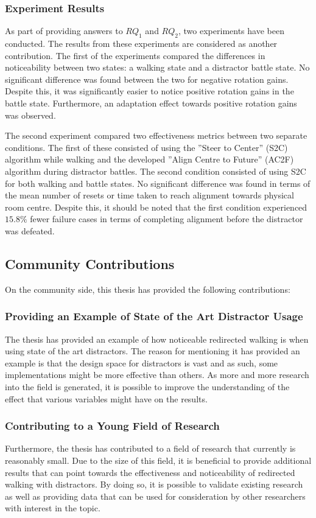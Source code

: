\subsubsection{Experiment Results}
As part of providing answers to $RQ_1$ and $RQ_2$, two experiments have been conducted. The results from these experiments are considered as another contribution. The first of the experiments compared the differences in noticeability between two states: a walking state and a distractor battle state. No significant difference was found between the two for negative rotation gains. Despite this, it was significantly easier to notice positive rotation gains in the battle state. Furthermore, an adaptation effect towards positive rotation gains was observed.

The second experiment compared two effectiveness metrics between two separate conditions. The first of these consisted of using the ''Steer to Center'' (S2C) algorithm while walking and the developed ''Align Centre to Future'' (AC2F) algorithm during distractor battles. The second condition consisted of using S2C for both walking and battle states. No significant difference was found in terms of the mean number of resets or time taken to reach alignment towards physical room centre. Despite this, it should be noted that the first condition experienced $15.8\%$ fewer failure cases in terms of completing alignment before the distractor was defeated. 

\subsection{Community Contributions}
On the community side, this thesis has provided the following contributions:

\subsubsection{Providing an Example of State of the Art Distractor Usage}
The thesis has provided an example of how noticeable redirected walking is when using state of the art distractors. The reason for mentioning it has provided an example is that the design space for distractors is vast and as such, some implementations might be more effective than others. As more and more research into the field is generated, it is possible to improve the understanding of the effect that various variables might have on the results. 

\subsubsection{Contributing to a Young Field of Research}
Furthermore, the thesis has contributed to a field of research that currently is reasonably small. Due to the size of this field, it is beneficial to provide additional results that can point towards the effectiveness and noticeability of redirected walking with distractors. By doing so, it is possible to validate existing research as well as providing data that can be used for consideration by other researchers with interest in the topic. 

